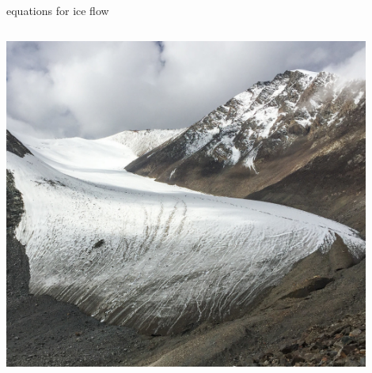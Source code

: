 \documentclass[10pt,hyperref={pdfpagelabels=true}]{beamer}
\begin{document}
\begin{frame}{equations for ice flow}
\begin{columns}
\begin{column}{0.35\textwidth}
\hfill\includegraphics[width=0.9\textwidth]{xinjiangglacier}
\end{column}
\end{columns}
\end{frame}
\end{document}
